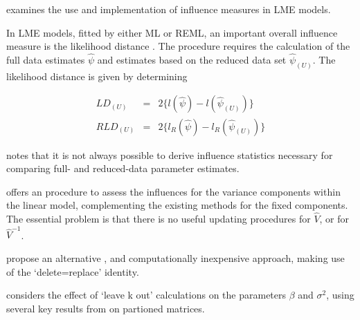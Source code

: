 \documentclass[12pt, a4paper]{report}
\theoremstyle{plain}
\theoremstyle{definition}
\theoremstyle{remark}
\begin{document}
\citet{schabenberger} examines the use and implementation of
influence measures in LME models.













In LME models, fitted by either ML or REML, an important overall
influence measure is the likelihood distance \citep{cook82}. The
procedure requires the calculation of the full data estimates
$\hat{\psi}$ and estimates based on the reduced data set
$\hat{\psi}_{(U)}$. The likelihood distance is given by
determining


\begin{eqnarray}
	LD_{(U)} &=& 2\{l(\hat{\psi}) - l( \hat{\psi}_{(U)}) \}\\
	RLD_{(U)} &=& 2\{l_{R}(\hat{\psi}) - l_{R}(\hat{\psi}_{(U)})\}
\end{eqnarray}









\citet{schabenberger} notes that it is not always possible to
derive influence statistics necessary for comparing full- and
reduced-data parameter estimates. 


\citet{HaslettDillane} offers an
procedure to assess the influences for the variance components
within the linear model, complementing the existing methods for the fixed components. The essential problem is that there is no useful updating procedures for $\hat{V}$, or for $\hat{V}^{-1}$.

\citet{HaslettDillane} propose an alternative , and
computationally inexpensive approach, making use of the
`delete=replace' identity.




\citet{Haslett99} considers the effect of `leave k out'
calculations on the parameters $\beta$ and $\sigma^{2}$, using
several key results from \citet{HaslettHayes} on partioned
matrices.






% 
% 
% 
\end{document}
